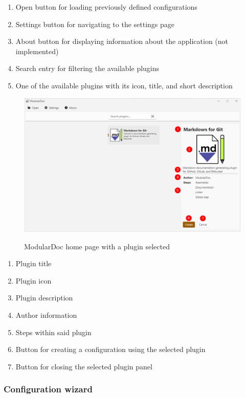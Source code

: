 \begin{enumerate}
    \item Open button for loading previously defined configurations
    \item Settings button for navigating to the settings page
    \item About button for displaying information about the application (not implemented)
    \item Search entry for filtering the available plugins
    \item One of the available plugins with its icon, title, and short description
\end{enumerate}

\begin{figure}[H]
    \includegraphics[width=\linewidth]{img/modularDocPluginSelected.png}
    \label{fig:modularDocPluginSelected}
    \caption{ModularDoc home page with a plugin selected}
\end{figure}

\begin{enumerate}
    \item Plugin title
    \item Plugin icon
    \item Plugin description
    \item Author information
    \item Steps within said plugin
    \item Button for creating a configuration using the selected plugin
    \item Button for closing the selected plugin panel
\end{enumerate}

\pagebreak
\subsubsection{Configuration wizard}

